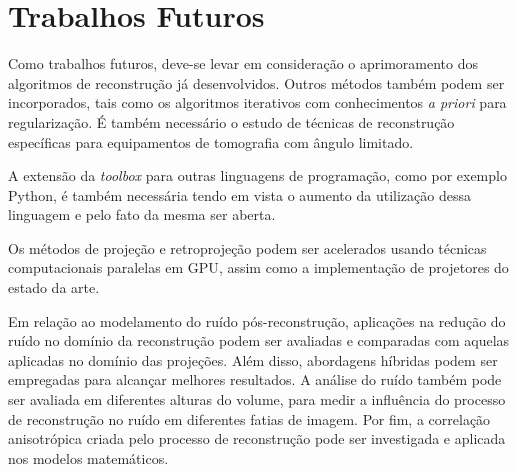 \chapter[Trabalhos Futuros]{Trabalhos Futuros}\label{Capitulo8}

Como trabalhos futuros, deve-se levar em consideração o aprimoramento dos algoritmos de reconstrução já desenvolvidos. Outros métodos também podem ser incorporados, tais como os algoritmos iterativos com conhecimentos \textit{a priori} para regularização. É também necessário o estudo de técnicas de reconstrução específicas para equipamentos de tomografia com ângulo limitado.

A extensão da \textit{toolbox} para outras linguagens de programação, como por exemplo Python, é também necessária tendo em vista o aumento da utilização dessa linguagem e pelo fato da mesma ser aberta.

Os métodos de projeção e retroprojeção podem ser acelerados usando técnicas computacionais paralelas em \acs{GPU}, assim como a implementação de projetores do estado da arte.  

Em relação ao modelamento do ruído pós-reconstrução, aplicações na redução do ruído no domínio da reconstrução podem ser avaliadas e comparadas com aquelas aplicadas no domínio das projeções. Além disso, abordagens híbridas podem ser empregadas para alcançar melhores resultados. A análise do ruído também pode ser avaliada em diferentes alturas do volume, para medir a influência do processo de reconstrução no ruído em diferentes fatias de imagem. Por fim, a correlação anisotrópica criada pelo processo de reconstrução pode ser investigada e aplicada nos modelos matemáticos.
